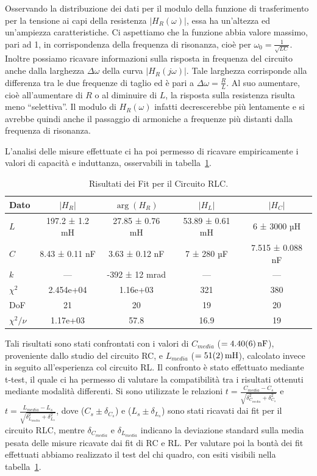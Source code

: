 \documentclass[a4paper]{article}
\begin{document}
Osservando la distribuzione dei dati per il modulo della funzione di trasferimento per la tensione ai capi della resistenza $|H_R(\omega)|$, essa ha un'altezza ed un'ampiezza caratteristiche. Ci aspettiamo che la funzione abbia valore massimo, pari ad 1, in corrispondenza della frequenza di risonanza, cioè per $\omega_0 = \frac{1}{\sqrt{LC}}$.
Inoltre possiamo ricavare informazioni sulla risposta in frequenza del circuito anche dalla larghezza $\Delta \omega$ della curva $|H_R(j\omega)|$. Tale larghezza corrisponde alla differenza tra le due frequenze di taglio ed è pari a $\Delta \omega = \frac{R}{L}$. Al suo aumentare, cioè all'aumentare di $R$ o al diminuire di $L$, la risposta sulla resistenza risulta meno ``selettiva''.
Il modulo di $H_R(\omega)$ infatti decrescerebbe più lentamente e si avrebbe quindi anche il passaggio di armoniche a frequenze più distanti dalla frequenza di risonanza.

L'analisi delle misure effettuate ci ha poi permesso di ricavare empiricamente i valori di capacità e induttanza, osservabili in tabella~\ref{tab:risultati_fit_rlc}.
\begin{table}[htbp]
\centering
\begin{tabular}{|l|cccc|}
\hline
Dato & $|H_R|$ & $\arg(H_R)$ & $|H_L|$ & $|H_C|$ \\\hline\hline
$L$ & 197.2 ± 1.2 mH & 27.85 ± 0.76 mH & 53.89 ± 0.61 mH & 6 ± 3000 µH \\\hline
$C$ & 8.43 ± 0.11 nF & 3.63 ± 0.12 nF & 7 ± 280 µF & 7.515 ± 0.088 nF \\\hline
$k$ & --- & -392 ± 12 mrad & --- & --- \\\hline
$\chi^2$ & 2.454e+04 & 1.16e+03 & 321 & 380 \\\hline
DoF & 21 & 20 & 19 & 20 \\\hline
$\chi^2/\nu$ & 1.17e+03 & 57.8 & 16.9 & 19 \\\hline
\end{tabular}
\caption{Risultati dei Fit per il Circuito RLC.}
\label{tab:risultati_fit_rlc}
\end{table}

Tali risultati sono stati confrontati con i valori di $C_{media}$ ($=\SI{4.40 \pm 0.06}{nF}$), proveniente dallo studio del circuito RC, e $L_{media}$ ($=\SI{51 \pm 2}{mH}$), calcolato invece in seguito all'esperienza col circuito RL. Il confronto è stato effettuato mediante t-test, il quale ci ha permesso di valutare la compatibilità tra i risultati ottenuti mediante modalità differenti. Si sono utilizzate le relazioni $ t = \frac{C_{media} - C_s}{\sqrt{\delta_{C_{media}}^2 + \delta_{C_s}^2}} $ e $ t = \frac{L_{media} - L_s}{\sqrt{\delta_{L_{media}}^2 + \delta_{L_s}^2}} $, dove ($C_s \pm \delta_{C_s}$) e ($L_s \pm \delta_{L_s}$) sono stati ricavati dai fit per il circuito RLC, mentre $\delta_{C_{media}}$ e $\delta_{L_{media}}$ indicano la deviazione standard sulla media pesata delle misure ricavate dai fit di RC e RL.
Per valutare poi la bontà dei fit effettuati abbiamo realizzato il test del chi quadro, con esiti visibili nella tabella~\ref{tab:risultati_fit_rlc}.
\end{document}
